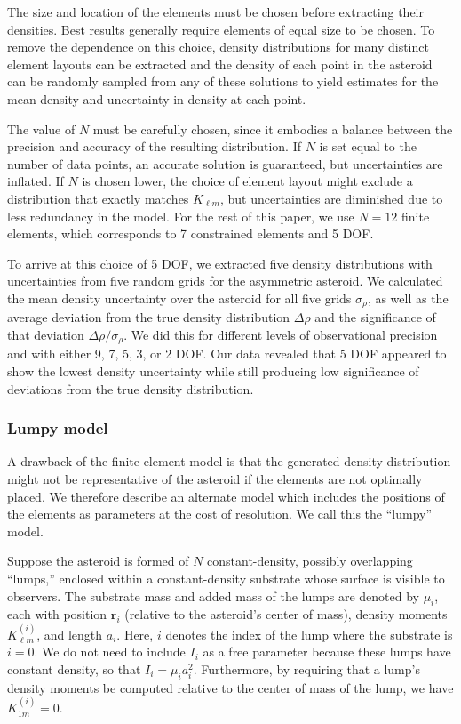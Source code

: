 \documentclass[fleqn,usenatbib]{mnras}
\begin{document}
The size and location of the elements must be chosen before extracting their densities. Best results generally require elements of equal size to be chosen. To remove the dependence on this choice, density distributions for many distinct element layouts can be extracted and the density of each point in the asteroid can be randomly sampled from any of these solutions to yield estimates for the mean density and uncertainty in density at each point.

The value of $N$ must be carefully chosen, since it embodies a balance between the precision and accuracy of the resulting distribution. If $N$ is set equal to the number of data points, an accurate solution is guaranteed, but uncertainties are inflated. If $N$ is chosen lower, the choice of element layout might exclude a distribution that exactly matches $K_{\ell m}$, but uncertainties are diminished due to less redundancy in the model. For the rest of this paper, we use $N=12$ finite elements, which corresponds to 7 constrained elements and 5 DOF.

To arrive at this choice of 5 DOF, we extracted five density distributions with uncertainties from five random grids for the asymmetric asteroid. We calculated the mean density uncertainty over the asteroid for all five grids $\sigma_\rho$, as well as the average deviation from the true density distribution $\Delta \rho$ and the significance of that deviation $\Delta \rho / \sigma_\rho$. We did this for different levels of observational precision and with either 9, 7, 5, 3, or 2 DOF. Our data revealed that 5 DOF appeared to show the lowest density uncertainty while still producing low significance of deviations from the true density distribution.

\subsubsection{Lumpy model}

A drawback of the finite element model is that the generated density distribution might not be representative of the asteroid if the elements are not optimally placed. We therefore describe an alternate model which includes the positions of the elements as parameters at the cost of resolution. We call this the ``lumpy'' model.

Suppose the asteroid is formed of $N$ constant-density, possibly overlapping ``lumps,'' enclosed within a constant-density substrate whose surface is visible to observers. The substrate mass and added mass of the lumps are denoted by $\mu_i$, each with position $\bm r_i$ (relative to the asteroid's center of mass), density moments $K_{\ell m}^{(i)}$, and length $a_i$. Here, $i$ denotes the index of the lump where the substrate is $i=0$.  We do not need to include $I_i$ as a free parameter because these lumps have constant density, so that $I_i = \mu_i a_i^2$. Furthermore, by requiring that a lump's density moments be computed relative to the center of mass of the lump, we have $K_{1m}^{(i)} = 0$.
\end{document}
